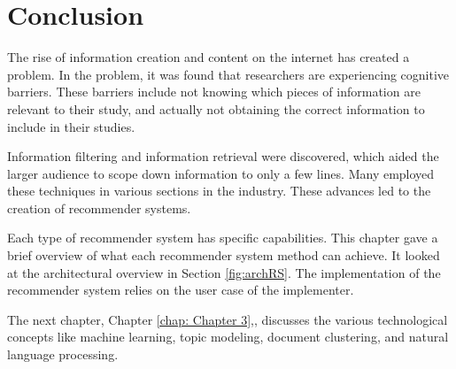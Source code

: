 \section{Conclusion}
The rise of information creation and content on the internet has created a problem. In the problem, it was found that researchers are experiencing cognitive barriers. These barriers include not knowing which pieces of information are relevant to their study, and actually not obtaining the correct information to include in their studies.

Information filtering and information retrieval were discovered, which aided the larger audience to scope down information to only a few lines. Many employed these techniques in various sections in the industry. These advances led to the creation of recommender systems.

Each type of recommender system has specific capabilities. This chapter gave a brief overview of what each recommender system method can achieve.  It looked at the architectural overview in Section \ref{fig:archRS}. The implementation of the recommender system relies on the user case of the implementer.

The next chapter, Chapter \ref{chap: Chapter 3},, discusses the various technological concepts like machine learning, topic modeling, document clustering, and natural language processing.




